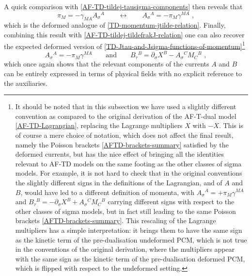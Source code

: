 \documentclass[12pt]{article}
\numberwithin{equation}{section}
\begin{document}
A quick comparison with \eqref{AF-TD-tildej-tausigma-components} then reveals that
\begin{equation}\label{AFTD-momentum-jtilde-relation}
\pi_{M}=-\gamma_{MA}A_{\sigma}{}^{A}
\qquad \longleftrightarrow \qquad 
A_{\sigma}{}^{A}=-\pi_{M}\gamma^{MA} \,\, ,
\end{equation}
which is the deformed analogue of \eqref{TD-momentum-jtilde-relation}. Finally, combining this result with \eqref{AF-TD-tildej-tildefrakJ-relation} one can also recover the expected deformed version of \eqref{TD-Jtau-and-Jsigma-functions-of-momentum}\footnote{It should be noted that in this subsection we have used a slightly different convention as compared to the original derivation \cite{Bielli:2024khq,Bielli:2024ach} of the AF-T-dual model \eqref{AF-TD-Lagrangian}, replacing the Lagrange multipliers $X$ with $-X$. This is of course a mere choice of notation, which does not affect the final result, namely the Poisson brackets \eqref{AFTD-brackets-summary} satisfied by the deformed currents, but has the nice effect of bringing all the identities relevant to AF-TD models on the same footing as the other classes of sigma models. For example, it is not hard to check that in the original conventions \cite{Bielli:2024khq,Bielli:2024ach} the slightly different signs in the definitions of the Lagrangian, and of $A$ and $B$, would have led to a different definition of momenta, with $A_{\sigma}{}^{A}=+\pi_{M}\gamma^{MA}$ and $B_{\tau}{}^{B}=-\partial_{\sigma}X^{B}+A_{\sigma}{}^{C}M_{C}{^{B}}$ carrying different signs with respect to the other classes of sigma models, but in fact still leading to the same Poisson brackets \eqref{AFTD-brackets-summary}. This rescaling of the Lagrange multipliers has a simple interpretation: it brings them to have the same sign as the kinetic term of the pre-dualisation undeformed PCM, which is not true in the conventions of the original derivation, where the multipliers appear with the same sign as the kinetic term of the pre-dualisation deformed PCM, which is flipped with respect to the undeformed setting.
}
\begin{equation}\label{AFTD-Jtau-and-Jsigma-functions-of-momentum}
A_{\sigma}{}^{A}=-\pi_{M}\gamma^{MA} 
\qquad \text{and} \qquad 
B_{\tau}{}^{B}=\partial_{\sigma}X^{B}-A_{\sigma}{}^{C}M_{C}{^{B}} \,\, ,
\end{equation}
which once again shows that the relevant components of the currents $A$ and $B$ can be entirely expressed in terms of physical fields with no explicit reference to the auxiliaries.
\end{document}
